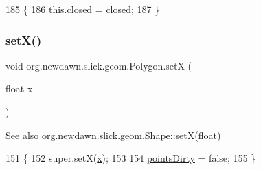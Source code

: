 \begin{DoxyCode}
185                                           \{
186         this.\mbox{\hyperlink{classorg_1_1newdawn_1_1slick_1_1geom_1_1_polygon_a8ca548fdf2452ba39c43fe3ba20b9ee8}{closed}} = \mbox{\hyperlink{classorg_1_1newdawn_1_1slick_1_1geom_1_1_polygon_a8ca548fdf2452ba39c43fe3ba20b9ee8}{closed}};
187     \}
\end{DoxyCode}
\mbox{\label{classorg_1_1newdawn_1_1slick_1_1geom_1_1_polygon_a9a974909df2106f648e7588b2e288c77}} 
\subsubsection{\texorpdfstring{set\+X()}{setX()}}
{\footnotesize\ttfamily void org.\+newdawn.\+slick.\+geom.\+Polygon.\+setX (\begin{DoxyParamCaption}\item[{float}]{x }\end{DoxyParamCaption})\hspace{0.3cm}{\ttfamily [inline]}}

\begin{DoxySeeAlso}{See also}
\mbox{\hyperlink{classorg_1_1newdawn_1_1slick_1_1geom_1_1_shape_a1469b8ef682642c4257869640c27bf16}{org.\+newdawn.\+slick.\+geom.\+Shape\+::set\+X(float)}} 
\end{DoxySeeAlso}

\begin{DoxyCode}
151                               \{
152         super.setX(\mbox{\hyperlink{classorg_1_1newdawn_1_1slick_1_1geom_1_1_shape_a3e985bfff386c15a4efaad03d8ad60d3}{x}});
153         
154         \mbox{\hyperlink{classorg_1_1newdawn_1_1slick_1_1geom_1_1_shape_a61fe1954d2fdefc72c34b284f4fcfdb4}{pointsDirty}} = \textcolor{keyword}{false};
155     \}
\end{DoxyCode}
\mbox{\label{classorg_1_1newdawn_1_1slick_1_1geom_1_1_polygon_af81dc676f1b6712b98dcaf0a065571f6}} 
